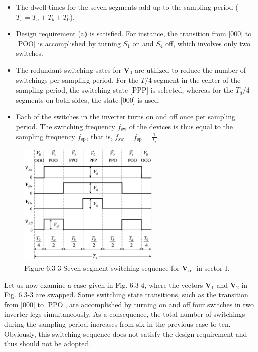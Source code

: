 \documentclass[letterpaper,12pt]{article}
\begin{document}
\begin{itemize}
    \item The dwell times for the seven segments add up to the sampling period (\( T_s = T_a + T_b + T_0 \)).
    \item Design requirement (a) is satisfied. For instance, the transition from [000] to [POO] is accomplished by turning \( S_1 \) on and \( S_4 \) off, which involves only two switches.
    \item The redundant switching sates for \( \mathbf{V}_0 \) are utilized to reduce the number of switchings per sampling period. For the \( T/4 \) segment in the center of the sampling period, the switching state [PPP] is selected, whereas for the \( T_d/4 \) segments on both sides, the state [000] is used.
    \item Each of the switches in the inverter turns on and off once per sampling period. The switching frequency \( f_{\text{sw}} \) of the devices is thus equal to the sampling frequency \( f_{\text{sp}} \), that is, \( f_{\text{sw}} = f_{\text{sp}} = \frac{1}{T_s} \).
\end{itemize}

\begin{figure}[h]
    \centering
    \includegraphics[width=0.6\textwidth]{graficos/img133.jpg}
    \caption{Figure 6.3-3 Seven-segment switching sequence for \( \mathbf{V}_{\text{ref}} \) in sector I.}
    \label{fig:6.3-3}
\end{figure}
\FloatBarrier

Let us now examine a case given in Fig. 6.3-4, where the vectors \( \mathbf{V}_1 \) and \( \mathbf{V}_2 \) in Fig. 6.3-3 are swapped. Some switching state transitions, such as the transition from [000] to [PPO], are accomplished by turning on and off four switches in two inverter legs simultaneously. As a consequence, the total number of switchings during the sampling period increases from six in the previous case to ten. Obviously, this switching sequence does not satisfy the design requirement and thus should not be adopted.
\end{document}
